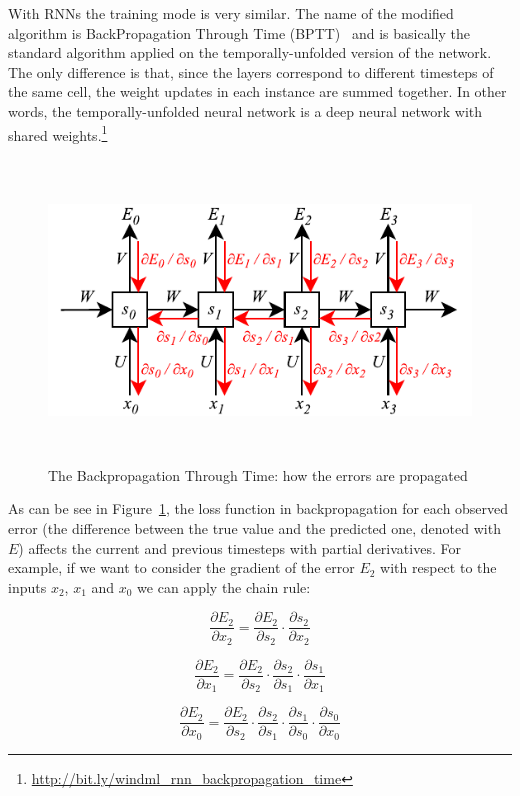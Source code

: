 With RNNs the training mode is very similar. The name of the modified algorithm is BackPropagation Through Time (BPTT)~\cite{werbos1990backpropagation} and is basically the standard algorithm applied on the temporally-unfolded version of the network. The only difference is that, since the layers correspond to different timesteps of the same cell, the weight updates in each instance are summed together. In other words, the temporally-unfolded neural network is a deep neural network with shared weights.\footnote{\url{http://bit.ly/windml_rnn_backpropagation_time}}

\begin{figure}[!htb]
    \centering
    \includegraphics[max width=0.9\linewidth,max height=8cm,keepaspectratio]{figures/bptt}
    \caption{The Backpropagation Through Time: how the errors are propagated}\label{fig:bptt}
\end{figure}

As can be see in Figure~\ref{fig:bptt}, the loss function in backpropagation for each observed error (the difference between the true value and the predicted one, denoted with $E$) affects the current and previous timesteps with partial derivatives. For example, if we want to consider the gradient of the error $E_{2}$ with respect to the inputs $x_{2}$, $x_{1}$ and $x_{0}$ we can apply the chain rule:

 $$\frac{ \partial E_{2}}{ \partial x_{2}}=\frac{ \partial E_{2}}{ \partial s_{2}}\cdot \frac{ \partial s_{2}}{ \partial x_{2}}$$

 $$\frac{ \partial E_{2}}{ \partial x_{1}}=\frac{ \partial E_{2}}{ \partial s_{2}}\cdot \frac{ \partial s_{2}}{ \partial s_{1}}\cdot \frac{ \partial s_{1}}{ \partial x_{1}}$$

 $$\frac{ \partial E_{2}}{ \partial x_{0}}=\frac{ \partial E_{2}}{ \partial s_{2}}\cdot \frac{ \partial s_{2}}{ \partial s_{1}}\cdot \frac{ \partial s_{1}}{ \partial s_{0}}\cdot \frac{ \partial s_{0}}{ \partial x_{0}}$$ 

